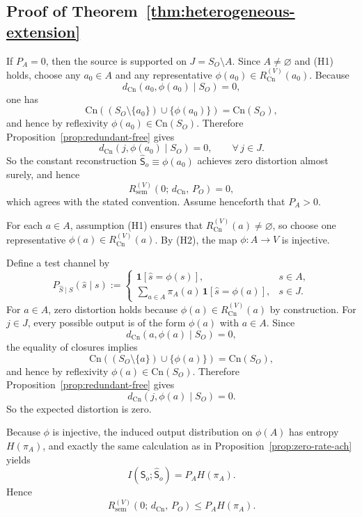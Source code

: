 \documentclass[journal,onecolumn]{IEEEtran}
\makeatletter
\newcommand{\Cn}{\text{Cn}}
\numberwithin{equation}{section}
\renewenvironment{proof}[1][\proofname]{\par
  \pushQED{\qed}%
  \normalfont \topsep6\p@\@plus6\p@\relax
  \trivlist
  \item[\hskip\labelsep
        \itshape
    #1\@addpunct{.}]\ignorespaces
}{%
  \popQED\endtrivlist\@endpefalse
}
\makeatother
\begin{document}
\subsection{Proof of Theorem~\ref{thm:heterogeneous-extension}}
\label{app:proof-heterogeneous-extension}

\begin{proof}
If \(P_A=0\), then the source is supported on \(J=S_O\setminus A\).
Since \(A\neq\varnothing\) and \textup{(H1)} holds, choose any
\(a_0\in A\) and any representative
\(\phi(a_0)\in R_{\Cn}^{(V)}(a_0)\).
Because
\[
  d_{\Cn}(a_0,\phi(a_0)\mid S_O)=0,
\]
one has
\[
  \Cn((S_O\setminus\{a_0\})\cup\{\phi(a_0)\})=\Cn(S_O),
\]
and hence by reflexivity \(\phi(a_0)\in\Cn(S_O)\).
Therefore Proposition~\ref{prop:redundant-free} gives
\[
  d_{\Cn}(j,\phi(a_0)\mid S_O)=0,
  \qquad \forall\,j\in J.
\]
So the constant reconstruction
\(\hat {\mathsf{S}}_o\equiv\phi(a_0)\) achieves zero distortion almost surely,
and hence
\[
  R_{\mathrm{sem}}^{(V)}(0;\,d_{\Cn},\,P_O)=0,
\]
which agrees with the stated convention. Assume henceforth that
\(P_A>0\).

For each \(a\in A\), assumption \textup{(H1)} ensures that
\(R_{\Cn}^{(V)}(a)\neq\varnothing\), so choose one representative
\(\phi(a)\in R_{\Cn}^{(V)}(a)\).
By \textup{(H2)}, the map \(\phi:A\to V\) is injective.

Define a test channel by
\[
  P_{\hat S\mid S}(\hat s\mid s)
  :=
  \begin{cases}
    \mathbf{1}[\hat s=\phi(s)], & s\in A,\\[3pt]
    \displaystyle\sum_{a\in A}\pi_A(a)\,\mathbf{1}[\hat s=\phi(a)],
    & s\in J.
  \end{cases}
\]
For \(a\in A\), zero distortion holds because
\(\phi(a)\in R_{\Cn}^{(V)}(a)\) by construction.
For \(j\in J\), every possible output is of the form \(\phi(a)\) with
\(a\in A\).
Since
\[
  d_{\Cn}(a,\phi(a)\mid S_O)=0,
\]
the equality of closures implies
\[
  \Cn((S_O\setminus\{a\})\cup\{\phi(a)\})=\Cn(S_O),
\]
and hence by reflexivity
\(\phi(a)\in \Cn(S_O)\).
Therefore Proposition~\ref{prop:redundant-free} gives
\[
  d_{\Cn}(j,\phi(a)\mid S_O)=0.
\]
So the expected distortion is zero.

Because \(\phi\) is injective, the induced output distribution on
\(\phi(A)\) has entropy \(H(\pi_A)\), and exactly the same
calculation as in Proposition~\ref{prop:zero-rate-ach} yields
\[
  I({\mathsf{S}}_o;\hat {\mathsf{S}}_o)=P_AH(\pi_A).
\]
Hence
\[
  R_{\mathrm{sem}}^{(V)}(0;\,d_{\Cn},\,P_O)\le P_AH(\pi_A).
\]


\end{proof}
\end{document}
